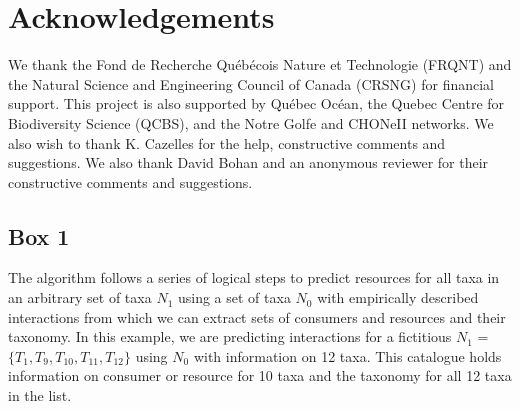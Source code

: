 \section{Acknowledgements}
We thank the Fond de Recherche Québécois Nature et Technologie (FRQNT) and the Natural Science and Engineering Council of Canada (CRSNG) for financial support. This project is also supported by Québec Océan, the Quebec Centre for Biodiversity Science (QCBS), and the Notre Golfe and CHONeII networks. We also wish to thank K. Cazelles for the help, constructive comments and suggestions. We also thank David Bohan and an anonymous reviewer for their constructive comments and suggestions.



\newpage
\subsection{Box 1}

The algorithm follows a series of logical steps to predict resources for all taxa in an arbitrary set of taxa $N_1$ using a set of taxa $N_0$ with empirically described interactions from which we can extract sets of consumers and resources and their taxonomy. In this example, we are predicting interactions for a fictitious $N_1$
 = $\{T_1, T_9, T_{10},T_{11}, T_{12}\}$ using $N_0$ with information on 12 taxa. This catalogue holds information on consumer or resource for 10 taxa and the taxonomy for all 12 taxa in the list.


